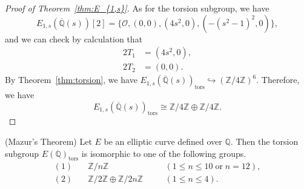 \documentclass[main]{subfiles}
\begin{document}
\begin{proof}[Proof of Theorem~\ref{thm:E_{1,s}}]
    As for the torsion subgroup, we have
    \begin{equation*}
        E_{1,s}(\overline{\mathbb{Q}}(s))[2] = \{\mathcal{O}, (0,0), (4s^{2},0),( - (s^{2} - 1)^{2},0)\},
    \end{equation*}
    and we can check by calculation that
    \begin{align}
        2T_1 & = (4s^2,0), \\
        2T_2 & = (0,0).
    \end{align}
    By Theorem~\ref{thm:torsion}, we have $E_{1,s}(\overline{\mathbb{Q}}(s))_ \text{tors} \hookrightarrow (\mathbb{Z} / 4 \mathbb{Z})^{6}$.
    Therefore, we have
    \begin{equation*}
        E_{1,s}(\overline{\mathbb{Q}}(s))_ \text{tors} \cong \mathbb{Z} / 4 \mathbb{Z} \oplus \mathbb{Z} / 4 \mathbb{Z}.
    \end{equation*}
\end{proof}

\begin{thm}{(Mazur's Theorem)}
    \label{thm:mazur}
    Let $E$ be an elliptic curve defined over $\mathbb{Q}$.
    Then the torsion subgroup $E(\mathbb{Q})_{\text{tors}}$ is isomorphic to one of the following groups.
    \begin{align*}
        (1) & \quad \mathbb{Z} / n \mathbb{Z} \quad                                   &  & (1 \leq n \leq 10 \; \text{or}\; n = 12), \\
        (2) & \quad \mathbb{Z} / 2 \mathbb{Z} \oplus \mathbb{Z} / 2n \mathbb{Z} \quad &  & (1 \leq n \leq 4).
    \end{align*}
\end{thm}
\end{document}
